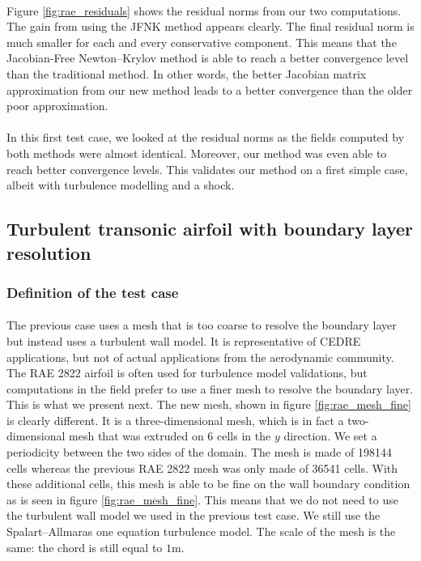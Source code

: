         \paragraph{}
        Figure \ref{fig:rae_residuals} shows the residual norms from our two computations.
        The gain from using the JFNK method appears clearly.
        The final residual norm is much smaller for each and every conservative component.
        This means that the Jacobian-Free Newton--Krylov method is able to reach a better convergence level than the traditional method.
        In other words, the better Jacobian matrix approximation from our new method leads to a better convergence than the older poor approximation.

        \paragraph{}
        In this first test case, we looked at the residual norms as the fields computed by both methods were almost identical.
        Moreover, our method was even able to reach better convergence levels.
        This validates our method on a first simple case, albeit with turbulence modelling and a shock.


    \subsection{Turbulent transonic airfoil with boundary layer resolution}

      \subsubsection{Definition of the test case}

        \paragraph{}
        The previous case uses a mesh that is too coarse to resolve the boundary layer but instead uses a turbulent wall model.
        It is representative of CEDRE applications, but not of actual applications from the aerodynamic community.
        The RAE 2822 airfoil is often used for turbulence model validations, but computations in the field prefer to use a finer mesh to resolve the boundary layer.
        This is what we present next.
        The new mesh, shown in figure \ref{fig:rae_mesh_fine} is clearly different.
        It is a three-dimensional mesh, which is in fact a two-dimensional mesh that was extruded on 6 cells in the $y$ direction.
        We set a periodicity between the two sides of the domain.
        The mesh is made of \num{198144} cells whereas the previous RAE 2822 mesh was only made of \num{36541} cells.
        With these additional cells, this mesh is able to be fine on the wall boundary condition as is seen in figure \ref{fig:rae_mesh_fine}.
        This means that we do not need to use the turbulent wall model we used in the previous test case.
        We still use the Spalart--Allmaras one equation turbulence model.
        The scale of the mesh is the same: the chord is still equal to $1\si{\meter}$.


